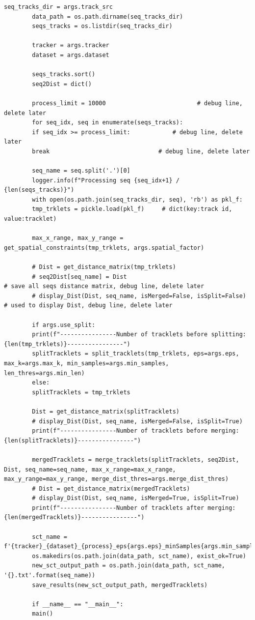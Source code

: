 \documentclass[12pt, a4paper, twoside]{article}
\begin{document}
\begin{lstlisting}[style=pythonstyle]
		seq_tracks_dir = args.track_src
		data_path = os.path.dirname(seq_tracks_dir)
		seqs_tracks = os.listdir(seq_tracks_dir)
		
		tracker = args.tracker
		dataset = args.dataset
		
		seqs_tracks.sort()
		seq2Dist = dict()
		
		process_limit = 10000                          # debug line, delete later
		for seq_idx, seq in enumerate(seqs_tracks):
		if seq_idx >= process_limit:            # debug line, delete later
		break                               # debug line, delete later
		
		seq_name = seq.split('.')[0]
		logger.info(f"Processing seq {seq_idx+1} / {len(seqs_tracks)}")
		with open(os.path.join(seq_tracks_dir, seq), 'rb') as pkl_f:
		tmp_trklets = pickle.load(pkl_f)     # dict(key:track id, value:tracklet)
		
		max_x_range, max_y_range = get_spatial_constraints(tmp_trklets, args.spatial_factor)
		
		# Dist = get_distance_matrix(tmp_trklets)
		# seq2Dist[seq_name] = Dist                                              # save all seqs distance matrix, debug line, delete later
		# display_Dist(Dist, seq_name, isMerged=False, isSplit=False)         # used to display Dist, debug line, delete later
		
		if args.use_split:
		print(f"----------------Number of tracklets before splitting: {len(tmp_trklets)}----------------")
		splitTracklets = split_tracklets(tmp_trklets, eps=args.eps, max_k=args.max_k, min_samples=args.min_samples, len_thres=args.min_len)
		else:
		splitTracklets = tmp_trklets
		
		Dist = get_distance_matrix(splitTracklets)
		# display_Dist(Dist, seq_name, isMerged=False, isSplit=True)
		print(f"----------------Number of tracklets before merging: {len(splitTracklets)}----------------")
		
		mergedTracklets = merge_tracklets(splitTracklets, seq2Dist, Dist, seq_name=seq_name, max_x_range=max_x_range, max_y_range=max_y_range, merge_dist_thres=args.merge_dist_thres)
		# Dist = get_distance_matrix(mergedTracklets)
		# display_Dist(Dist, seq_name, isMerged=True, isSplit=True)
		print(f"----------------Number of tracklets after merging: {len(mergedTracklets)}----------------")
		
		sct_name = f'{tracker}_{dataset}_{process}_eps{args.eps}_minSamples{args.min_samples}_K{args.max_k}_mergeDist{args.merge_dist_thres}_spatial{args.spatial_factor}'
		os.makedirs(os.path.join(data_path, sct_name), exist_ok=True)
		new_sct_output_path = os.path.join(data_path, sct_name, '{}.txt'.format(seq_name))
		save_results(new_sct_output_path, mergedTracklets)
		
		if __name__ == "__main__":
		main()
		
	\end{lstlisting}
	
\end{document}

